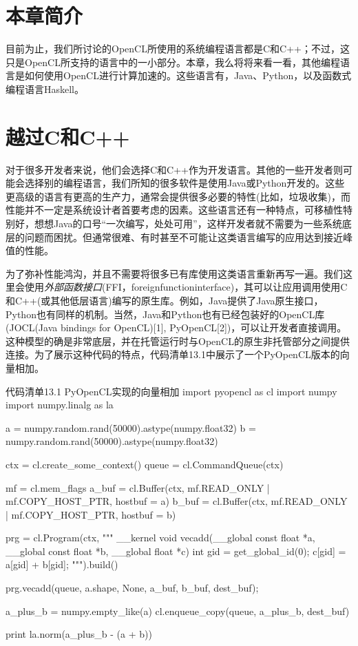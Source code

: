 

\section{本章简介}

目前为止，我们所讨论的OpenCL所使用的系统编程语言都是C和C++；不过，这只是OpenCL所支持的语言中的一小部分。本章，我么将将来看一看，其他编程语言是如何使用OpenCL进行计算加速的。这些语言有，Java、Python，以及函数式编程语言Haskell。



\section{越过C和C++}

对于很多开发者来说，他们会选择C和C++作为开发语言。其他的一些开发者则可能会选择别的编程语言，我们所知的很多软件是使用Java或Python开发的。这些更高级的语言有更高的生产力，通常会提供很多必要的特性(比如，垃圾收集)，而性能并不一定是系统设计者首要考虑的因素。这些语言还有一种特点，可移植性特别好，想想Java的口号“一次编写，处处可用”，这样开发者就不需要为一些系统底层的问题而困扰。但通常很难、有时甚至不可能让这类语言编写的应用达到接近峰值的性能。

为了弥补性能鸿沟，并且不需要将很多已有库使用这类语言重新再写一遍。我们这里会使用\emph{外部函数接口}(FFI，foreignfunctioninterface)，其可以让应用调用使用C和C++(或其他低层语言)编写的原生库。例如，Java提供了Java原生接口，Python也有同样的机制。当然，Java和Python也有已经包装好的OpenCL库(JOCL(Java bindings for OpenCL)[1], PyOpenCL[2])，可以让开发者直接调用。这种模型的确是非常底层，并在托管运行时与OpenCL的原生非托管部分之间提供连接。为了展示这种代码的特点，代码清单13.1中展示了一个PyOpenCL版本的向量相加。

\begin{codeboxt}[python]{代码清单13.1 PyOpenCL实现的向量相加}
import pyopencl as cl
import numpy
import numpy.linalg as la

a = numpy.random.rand(50000).astype(numpy.float32)
b = numpy.random.rand(50000).astype(numpy.float32)

ctx = cl.create_some_context()
queue = cl.CommandQueue(ctx)

mf = cl.mem_flags
a_buf = cl.Buffer(ctx, mf.READ_ONLY | mf.COPY_HOST_PTR, hostbuf = a)
b_buf = cl.Buffer(ctx, mf.READ_ONLY | mf.COPY_HOST_PTR, hostbuf = b)

prg = cl.Program(ctx, """
    __kernel void vecadd(__global const float *a,
                         __global const float *b,
                         __global float *c){
    int gid = get_global_id(0);
    c[gid] = a[gid] + b[gid];
    }
    """).build()

prg.vecadd(queue, a.shape, None, a_buf, b_buf, dest_buf);

a_plus_b = numpy.empty_like(a)
cl.enqueue_copy(queue, a_plus_b, dest_buf)

print la.norm(a_plus_b - (a + b))
\end{codeboxt}


